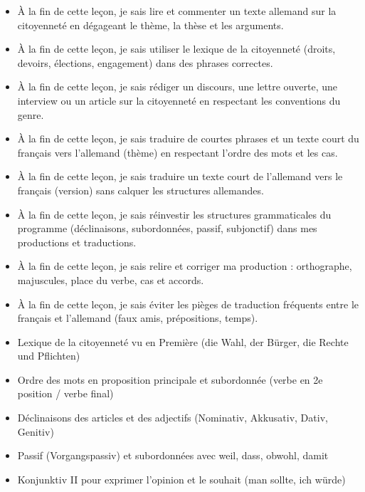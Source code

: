 \documentclass[11pt]{article}
\begin{document}
\begin{objectifs}
\begin{itemize}
\item À la fin de cette leçon, je sais lire et commenter un texte allemand sur la citoyenneté en dégageant le thème, la thèse et les arguments.
\item À la fin de cette leçon, je sais utiliser le lexique de la citoyenneté (droits, devoirs, élections, engagement) dans des phrases correctes.
\item À la fin de cette leçon, je sais rédiger un discours, une lettre ouverte, une interview ou un article sur la citoyenneté en respectant les conventions du genre.
\item À la fin de cette leçon, je sais traduire de courtes phrases et un texte court du français vers l'allemand (thème) en respectant l'ordre des mots et les cas.
\item À la fin de cette leçon, je sais traduire un texte court de l'allemand vers le français (version) sans calquer les structures allemandes.
\item À la fin de cette leçon, je sais réinvestir les structures grammaticales du programme (déclinaisons, subordonnées, passif, subjonctif) dans mes productions et traductions.
\item À la fin de cette leçon, je sais relire et corriger ma production : orthographe, majuscules, place du verbe, cas et accords.
\item À la fin de cette leçon, je sais éviter les pièges de traduction fréquents entre le français et l'allemand (faux amis, prépositions, temps).
\end{itemize}
\end{objectifs}

\begin{prerequis}
\begin{itemize}
\item Lexique de la citoyenneté vu en Première (die Wahl, der Bürger, die Rechte und Pflichten)
\item Ordre des mots en proposition principale et subordonnée (verbe en 2e position / verbe final)
\item Déclinaisons des articles et des adjectifs (Nominativ, Akkusativ, Dativ, Genitiv)
\item Passif (Vorgangspassiv) et subordonnées avec weil, dass, obwohl, damit
\item Konjunktiv II pour exprimer l'opinion et le souhait (man sollte, ich würde)
\end{itemize}
\end{prerequis}
\end{document}
